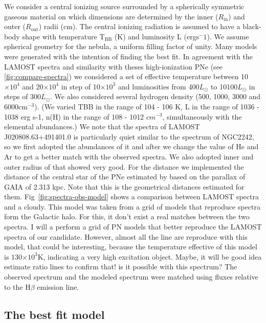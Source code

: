 \documentclass[fleqn,usenatbib]{mnras}
\begin{document}
{We consider a central ionizing source surrounded by a spherically symmetric
gaseous material on which dimensions are determined by the inner ($R_{\mathrm{in}}$) and outer ($R_{\mathrm{out}}$)
radii (cm).  The central ionizing radiation is assumed to have a
black-body shape with temperature T$_{\mathrm{BB}}$ (K) and luminosity L
(ergs$^-1$). We assume spherical geometry for the nebula, a uniform filling factor of unity.
Many models were generated with the intention of finding the best fit.
In agreement with the LAMOST spectra and similarity with theses high-ionization PNe
(see \ref{fig:compare-spectra})
we considered a set of effective temperature between 10$\times10^4$ and 20$\times10^4$
in step of 10$\times10^3$ and luminosities from 400$L_{\odot}$ to 10100$L_{\odot}$ in steps
of 300$L_{\odot}$. We also considered several hydrogen density (500, 1000, 3000 and 6000cm$^{-3}$).
(We varied TBB in the
range of 104 - 106 K, L in the range of 1036 - 1038 erg s-1, n(H)
in the range of 108 - 1012 $cm^{-3}$, simultaneously with the elemental abundances.)
We note that the spectra of LAMOST J020808.63+491401.0 is particularly quiet similar to the
spectrum of NGC2242, so we first adopted the abundances of it and after we change the
value of He and Ar to get a better match with the observed spectra. We also adopted inner
and outer radius
of that showed very good. For the distance we implemented the distance of the central star
of the PNe estimated by \citet{Bailer:2021} based on
the parallax of GAIA of 2.313 kpc. Note that this is the geometrical distances estimated for them. 
Fig~\ref{fig:spectra-obs-model} shows a comparison
between LAMOST spectra and a {\sc cloudy}. This model was taken from a grid of
models that reproduce spectra form the Galactic halo. For this, it don't exist a real matches between the two spectra.
I will a perform a grid of PN models that better reproduce the LAMOST spectra of our candidate.
However, almost all the line are reproduce with this model, that could be interesting, because the
temperature effective of this model is 130$\times10^3$K, indicating a very high excitation object.
Maybe, it will be good idea estimate ratio lines to confirm that! is it possible with this spectrum?
The observed spectrum and the modeled spectrum were
matched using fluxes relative to the H{$\beta$} emission line.

\subsection{The best fit model}
\label{sec:best-fit}

}
\end{document}
